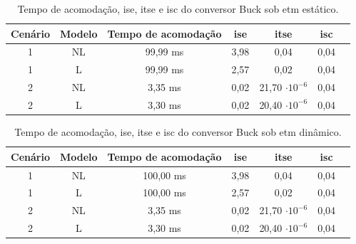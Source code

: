 \vspace{8pt}
\begin{table}[H]
  \centering
  \captionsetup{justification=centering}
  \setlength{\tabcolsep}{10pt}
  \begin{tabular}{ccccccc}
    \toprule
    Cenário & Modelo      & Tempo de acomodação & \acrshort{ise} & \acrshort{itse}       & \acrshort{isc} \\
    \midrule
    1       & NL  & 99,99 ms            & 3,98           & 0,04                  & 0,04           \\
    1       & L & 99,99 ms            & 2,57           & 0,02                  & 0,04           \\
    2       & NL  & 3,35 ms             & 0,02           & 21,70 $\cdot 10^{-6}$ & 0,04           \\
    2       & L & 3,30 ms             & 0,02           & 20,40 $\cdot 10^{-6}$ & 0,04           \\
    \bottomrule
  \end{tabular}
  \caption{Tempo de acomodação, \acrshort{ise}, \acrshort{itse} e \acrshort{isc} do conversor Buck sob \acrshort{etm} estático.}
  \label{table:indices_desempenho_etm_estático}
\end{table}

\vspace{8pt}
\begin{table}[H]
  \centering
  \captionsetup{justification=centering}
  \setlength{\tabcolsep}{10pt}
  \begin{tabular}{ccccccc}
    \toprule
    Cenário & Modelo      & Tempo de acomodação & \acrshort{ise} & \acrshort{itse}       & \acrshort{isc} \\
    \midrule
    1       & NL  & 100,00 ms           & 3,98           & 0,04                  & 0,04           \\
    1       & L & 100,00 ms           & 2,57           & 0,02                  & 0,04           \\
    2       & NL  & 3,35 ms             & 0,02           & 21,70 $\cdot 10^{-6}$ & 0,04           \\
    2       & L & 3,30 ms             & 0,02           & 20,40 $\cdot 10^{-6}$ & 0,04           \\
    \bottomrule
  \end{tabular}
  \caption{Tempo de acomodação, \acrshort{ise}, \acrshort{itse} e \acrshort{isc} do conversor Buck sob \acrshort{etm} dinâmico.}
  \label{table:indices_desempenho_etm_dinamico}
\end{table}

